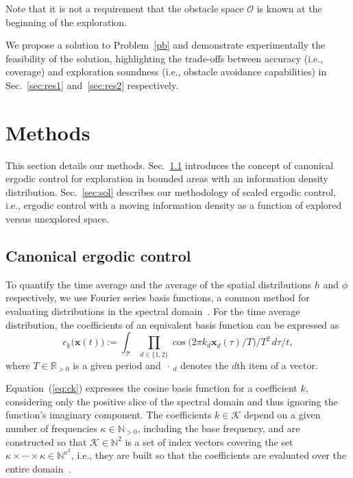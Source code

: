 \documentclass[letterpaper,10pt,conference,twoside]{IEEEtran}
\theoremstyle{definition}
\begin{document}
Note that it is not a requirement that the obstacle space $\mathcal{O}$ is known at the beginning of the exploration.

We propose a solution to Problem~\ref{pb} and demonstrate experimentally the feasibility of the solution, highlighting the trade-offs between accuracy (i.e., coverage) and exploration soundness (i.e., obstacle avoidance capabilities) in Sec.~\ref{sec:res1} and~\ref{sec:res2} respectively.


\section{Methods}\label{sec:meth}
\noindent
This section details our methods. Sec.~\ref{sec:canon} introduces the concept of canonical ergodic control for exploration in bounded areas with an information density distribution. Sec.~\ref{sec:sol} describes our methodology of scaled ergodic control, i.e., ergodic control with a moving information density as a function of explored versus unexplored space.

\subsection{Canonical ergodic control}
\label{sec:canon}
\noindent
To quantify the time average and the average of the spatial distributions $h$ and $\phi$ respectively, we use Fourier series basis functions, a common method for evaluating distributions in the spectral domain~\cite{mathew2011metrics}. For the time average distribution, the coefficients of an equivalent basis function can be expressed as
\begin{equation}\label{eq:ck}
  c_k\big(\mathbf{x}(t)\big):=\int_{\mathcal{T}}{\prod_{d\in\{1,2\}}}{\cos{\big(2\pi k_d\mathbf{x}_d(\tau)/T\big)}/T^2}\,d\tau/t,
\end{equation}
where $T\in\mathbb{R}_{>0}$ is a given period and $\,\cdot\,_d$ denotes the $d$th item of a vector.

Equation~(\ref{eq:ck}) expresses the cosine basis function for a coefficient $k$, considering only the positive slice of the spectral domain and thus ignoring the function's imaginary component. The coefficients $k\in\mathcal{K}$ depend on a given number of frequencies $\kappa\in\mathbb{N}_{>0}$, including the base frequency, and are constructed so that $\mathcal{K}\in\mathbb{N}^2$ is a set of index vectors covering the set $\kappa\times\cdots\times\kappa\in\mathbb{N}^{\kappa^2}$, i.e., they are built so that the coefficients are evaluated over the entire domain~\cite{calinon2020mixture}.
\end{document}

